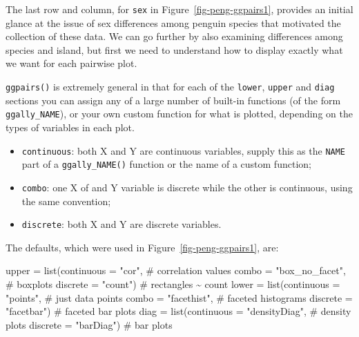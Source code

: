 \documentclass[
  letterpaper,
  10pt,
  krantz2]{krantz}
\makeatletter
\newenvironment{Shaded}{\begin{snugshade}}{\end{snugshade}}
\newcommand{\AttributeTok}[1]{\textcolor[rgb]{0.40,0.45,0.13}{#1}}
\newcommand{\CommentTok}[1]{\textcolor[rgb]{0.37,0.37,0.37}{#1}}
\newcommand{\FunctionTok}[1]{\textcolor[rgb]{0.28,0.35,0.67}{#1}}
\newcommand{\NormalTok}[1]{\textcolor[rgb]{0.00,0.23,0.31}{#1}}
\newcommand{\OtherTok}[1]{\textcolor[rgb]{0.00,0.23,0.31}{#1}}
\newcommand{\StringTok}[1]{\textcolor[rgb]{0.13,0.47,0.30}{#1}}
\providecommand{\tightlist}{%
  \setlength{\itemsep}{0pt}\setlength{\parskip}{0pt}}\usepackage{longtable,booktabs,array}
\newenvironment{kframe}{%
  \medskip{}
  \setlength{\fboxsep}{.8em}
  \def\at@end@of@kframe{}%
  \ifinner\ifhmode%
  \def\at@end@of@kframe{\end{minipage}}%
  \begin{minipage}{\columnwidth}%
  \fi\fi%
  \def\FrameCommand##1{\hskip\@totalleftmargin \hskip-\fboxsep
  \colorbox{shadecolor}{##1}\hskip-\fboxsep
      \hskip-\linewidth \hskip-\@totalleftmargin \hskip\columnwidth}%
  \MakeFramed {\advance\hsize-\width
    \@totalleftmargin\z@ \linewidth\hsize
    \@setminipage}}%
{\par\unskip\endMakeFramed%
  \at@end@of@kframe}
\renewenvironment{Shaded}{\begin{kframe}}{\end{kframe}}
\makeatother
\begin{document}
The last row and column, for \texttt{sex} in
Figure~\ref{fig-peng-ggpairs1}, provides an initial glance at the issue
of sex differences among penguin species that motivated the collection
of these data. We can go further by also examining differences among
species and island, but first we need to understand how to display
exactly what we want for each pairwise plot.

\texttt{ggpairs()} is extremely general in that for each of the
\texttt{lower}, \texttt{upper} and \texttt{diag} sections you can assign
any of a large number of built-in functions (of the form
\texttt{ggally\_NAME}), or your own custom function for what is plotted,
depending on the types of variables in each plot.

\begin{itemize}
\tightlist
\item
  \texttt{continuous}: both X and Y are continuous variables, supply
  this as the \texttt{NAME} part of a \texttt{ggally\_NAME()} function
  or the name of a custom function;
\item
  \texttt{combo}: one X of and Y variable is discrete while the other is
  continuous, using the same convention;
\item
  \texttt{discrete}: both X and Y are discrete variables.
\end{itemize}

The defaults, which were used in Figure~\ref{fig-peng-ggpairs1}, are:

\begin{Shaded}
\begin{Highlighting}[]
\NormalTok{upper }\OtherTok{=} \FunctionTok{list}\NormalTok{(}\AttributeTok{continuous =} \StringTok{"cor"}\NormalTok{,          }\CommentTok{\# correlation values}
             \AttributeTok{combo =} \StringTok{"box\_no\_facet"}\NormalTok{,      }\CommentTok{\# boxplots }
             \AttributeTok{discrete =} \StringTok{"count"}\NormalTok{)          }\CommentTok{\# rectangles \textasciitilde{} count}
\NormalTok{lower }\OtherTok{=} \FunctionTok{list}\NormalTok{(}\AttributeTok{continuous =} \StringTok{"points"}\NormalTok{,       }\CommentTok{\# just data points}
             \AttributeTok{combo =} \StringTok{"facethist"}\NormalTok{,         }\CommentTok{\# faceted histograms}
             \AttributeTok{discrete =} \StringTok{"facetbar"}\NormalTok{)       }\CommentTok{\# faceted bar plots}
\NormalTok{diag  }\OtherTok{=} \FunctionTok{list}\NormalTok{(}\AttributeTok{continuous =} \StringTok{"densityDiag"}\NormalTok{,  }\CommentTok{\# density plots}
             \AttributeTok{discrete =} \StringTok{"barDiag"}\NormalTok{)        }\CommentTok{\# bar plots}
\end{Highlighting}
\end{Shaded}
\end{document}
